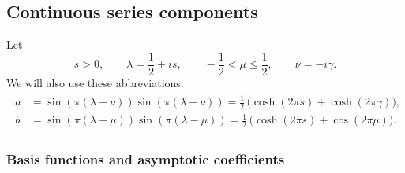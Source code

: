 \documentclass[12pt]{article}
\begin{document}
\subsection{Continuous series components } \label{app:cont}

Let
\begin{equation}
s>0,\qquad \lambda=\frac{1}{2}+is,\qquad -\frac{1}{2}<\mu\leq\frac{1}{2},\qquad
\nu=-i\gamma.
\end{equation}
We will also use these abbreviations:
\begin{gather}
\begin{aligned}
a&=\sin(\pi(\lambda+\nu))\sin(\pi(\lambda-\nu))
=\frac{1}{2}\,\bigl(\cosh(2\pi s)+\cosh(2\pi\gamma)\bigr),\\[3pt]
b&=\sin(\pi(\lambda+\mu))\sin(\pi(\lambda-\mu))
=\frac{1}{2}\,\bigl(\cosh(2\pi s)+\cos(2\pi\mu)\bigr).
\end{aligned}
\end{gather}

\subsubsection{Basis functions and asymptotic coefficients }
\end{document}

